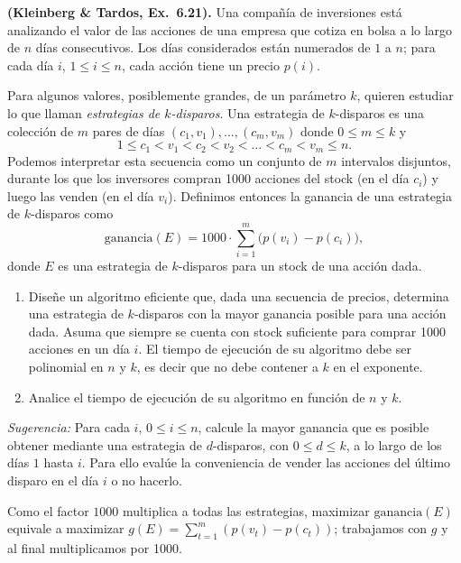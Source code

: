 \begin{enunciado}
\textbf{(Kleinberg \& Tardos, Ex.~6.21).} Una compañía de inversiones está analizando el valor de las
acciones de una empresa que cotiza en bolsa a lo largo de $n$ días consecutivos. Los días considerados están
numerados de $1$ a $n$; para cada día $i$, $1\le i\le n$, cada acción tiene un precio $p(i)$.

Para algunos valores, posiblemente grandes, de un parámetro $k$, quieren estudiar lo que llaman
\emph{estrategias de $k$-disparos}. Una estrategia de $k$-disparos es una colección de $m$ pares de días
$(c_1,v_1),\dots,(c_m,v_m)$ donde $0\le m\le k$ y
\[ 1\le c_1<v_1<c_2<v_2<\dots<c_m<v_m\le n. \]
Podemos interpretar esta secuencia como un conjunto de $m$ intervalos disjuntos, durante los que los
inversores compran 1000 acciones del stock (en el día $c_i$) y luego las venden (en el día $v_i$). Definimos
entonces la ganancia de una estrategia de $k$-disparos como
\[ \mathrm{ganancia}(E) = 1000\cdot\sum_{i=1}^{m}\bigl(p(v_i)-p(c_i)\bigr), \]
donde $E$ es una estrategia de $k$-disparos para un stock de una acción dada.
\begin{enumerate}[label=(\alph*)]
\item Diseñe un algoritmo eficiente que, dada una secuencia de precios, determina una estrategia de
  $k$-disparos con la mayor ganancia posible para una acción dada. Asuma que siempre se cuenta con stock
  suficiente para comprar 1000 acciones en un día $i$. El tiempo de ejecución de su algoritmo debe ser
  polinomial en $n$ y $k$, es decir que no debe contener a $k$ en el exponente.
\item Analice el tiempo de ejecución de su algoritmo en función de $n$ y $k$.
\end{enumerate}
\emph{Sugerencia:} Para cada $i$, $0\le i\le n$, calcule la mayor ganancia que es posible obtener mediante
una estrategia de $d$-disparos, con $0\le d\le k$, a lo largo de los días $1$ hasta $i$. Para ello evalúe la
conveniencia de vender las acciones del último disparo en el día $i$ o no hacerlo.
\end{enunciado}


Como el factor $1000$ multiplica a todas las estrategias, maximizar $\mathrm{ganancia}(E)$ equivale a maximizar
$g(E)=\sum_{t=1}^m (p(v_t)-p(c_t))$; trabajamos con $g$ y al final multiplicamos por 1000.

